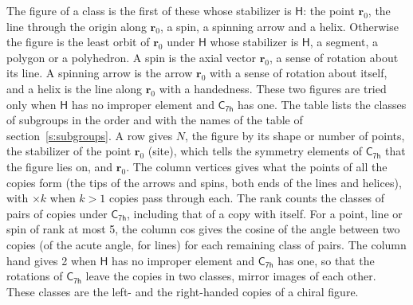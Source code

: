 \documentclass[10pt,a4paper]{article}
\numberwithin{equation}{section}
\newcommand{\grp}[1]{\mathsf{#1}}
\newcommand{\pointr}{\mathbf{r}}
\begin{document}
\leavevmode\label{n:head.figure}The figure of a class is the first of these whose stabilizer is $\grp{H}$: the point $\pointr_0$, the line through the origin along $\pointr_0$, a spin, a spinning arrow and a helix. Otherwise the figure is the least orbit of $\pointr_0$ under $\grp{H}$ whose stabilizer is $\grp{H}$, a segment, a polygon or a polyhedron. A spin is the axial vector $\pointr_0$, a sense of rotation about its line. A spinning arrow is the arrow $\pointr_0$ with a sense of rotation about itself, and a helix is the line along $\pointr_0$ with a handedness. These two figures are tried only when $\grp{H}$ has no improper element and $\grp{C_{7h}}$ has one. The table lists the classes of subgroups in the order and with the names of the table of section~\ref{s:subgroups}. \label{n:head.site}A row gives $N$, the figure by its shape or number of points, the stabilizer of the point $\pointr_0$ (site), which tells the symmetry elements of $\grp{C_{7h}}$ that the figure lies on, and $\pointr_0$. \label{n:head.vertices}The column vertices gives what the points of all the copies form (the tips of the arrows and spins, both ends of the lines and helices), with ${\times}k$ when $k > 1$ copies pass through each. \label{n:head.rank}The rank counts the classes of pairs of copies under $\grp{C_{7h}}$, including that of a copy with itself. \label{n:head.cos}For a point, line or spin of rank at most 5, the column cos gives the cosine of the angle between two copies (of the acute angle, for lines) for each remaining class of pairs. \label{n:head.hand}The column hand gives 2 when $\grp{H}$ has no improper element and $\grp{C_{7h}}$ has one, so that the rotations of $\grp{C_{7h}}$ leave the copies in two classes, mirror images of each other. These classes are the left- and the right-handed copies of a chiral figure.
\end{document}

